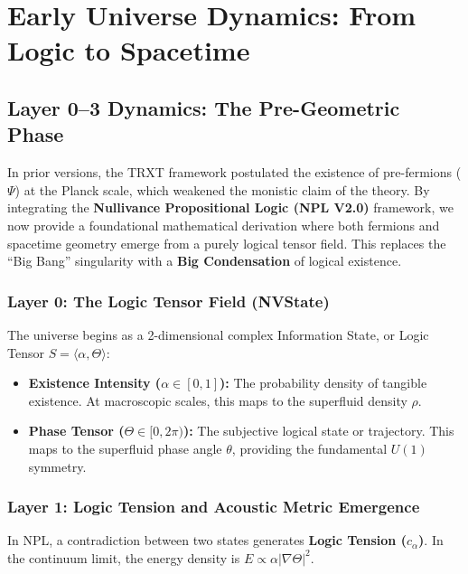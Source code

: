 \documentclass[a4paper,12pt]{article}
\begin{document}
\section{Early Universe Dynamics: From Logic to Spacetime}

\subsection{Layer 0--3 Dynamics: The Pre-Geometric Phase}

In prior versions, the TRXT framework postulated the existence of pre-fermions ($\Psi$) at the Planck scale, which weakened the monistic claim of the theory. By integrating the \textbf{Nullivance Propositional Logic (NPL V2.0)} framework, we now provide a foundational mathematical derivation where both fermions and spacetime geometry emerge from a purely logical tensor field. This replaces the ``Big Bang'' singularity with a \textbf{Big Condensation} of logical existence.

\subsubsection{Layer 0: The Logic Tensor Field (NVState)}
The universe begins as a 2-dimensional complex Information State, or Logic Tensor $S = \langle \alpha, \Theta \rangle$:
\begin{itemize}
    \item \textbf{Existence Intensity ($\alpha \in [0, 1]$):} The probability density of tangible existence. At macroscopic scales, this maps to the superfluid density $\rho$.
    \item \textbf{Phase Tensor ($\Theta \in [0, 2\pi)$):} The subjective logical state or trajectory. This maps to the superfluid phase angle $\theta$, providing the fundamental $U(1)$ symmetry. 
\end{itemize}

\subsubsection{Layer 1: Logic Tension and Acoustic Metric Emergence}
In NPL, a contradiction between two states generates \textbf{Logic Tension ($c_\alpha$)}. In the continuum limit, the energy density is $E \propto \alpha |\nabla \Theta|^2$. 
\end{document}
